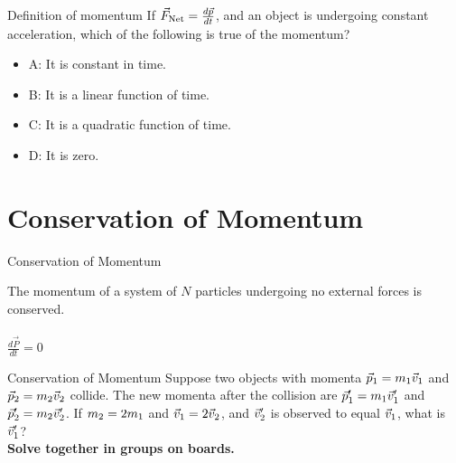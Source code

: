 \documentclass{beamer}
\begin{document}
\begin{frame}{Definition of momentum}
If $\vec{F}_{\rm Net} = \frac{d\vec{p}}{dt}$, and an object is undergoing constant acceleration, which of the following is true of the momentum?
\begin{itemize}
\item A: It is constant in time.
\item B: It is a linear function of time.
\item C: It is a quadratic function of time.
\item D: It is zero.
\end{itemize}
\end{frame}

\section{Conservation of Momentum}

\begin{frame}{Conservation of Momentum}
\begin{tcolorbox}[colback=white,colframe=red!40!blue,title=Conservation of Momentum]
\alert{The momentum of a system of $N$ particles undergoing no external forces is conserved.} \\ \\
\alert{$\frac{d\vec{P}}{dt}=0$}
\end{tcolorbox}
\end{frame}

\begin{frame}{Conservation of Momentum}
Suppose two objects with momenta $\vec{p}_{\rm 1} = m_{\rm 1}\vec{v}_{\rm 1}$ and $\vec{p}_{\rm 2} = m_{\rm 2}\vec{v}_{\rm 2}$ collide. The new momenta after the collision are $\vec{p}'_{\rm 1} = m_{\rm 1}\vec{v}'_{\rm 1}$ and $\vec{p}'_{\rm 2} = m_{\rm 2}\vec{v}'_{\rm 2}$.  If $m_{\rm 2} = 2 m_{\rm 1}$ and $\vec{v}_{\rm 1} = 2\vec{v}_{\rm 2}$, and $\vec{v}'_{\rm 2}$ is observed to equal $\vec{v}_{\rm 1}$, what is $\vec{v}'_{\rm 1}$? \\ \vspace{1cm}
\textbf{Solve together in groups on boards.}
\end{frame}
\end{document}
